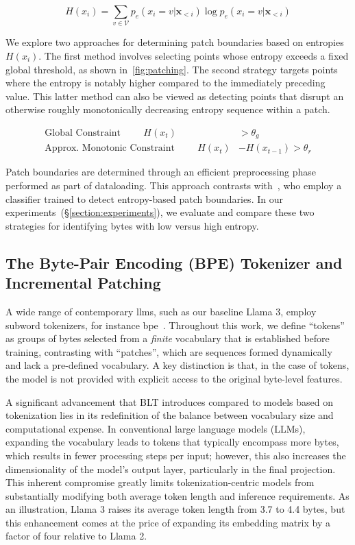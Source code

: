 \begin{equation}
H(x_i) = \sum_{v \in \mathcal{V}} p_{e}(x_i=v|\pmb{x}_{<i}) \log p_{e}(x_i=v|\pmb{x}_{<i})
\end{equation}

We explore two approaches for determining patch boundaries based on entropies $H(x_i)$. The first method involves selecting points whose entropy exceeds a fixed global threshold, as shown in~\autoref{fig:patching}. The second strategy targets points where the entropy is notably higher compared to the immediately preceding value. This latter method can also be viewed as detecting points that disrupt an otherwise roughly monotonically decreasing entropy sequence within a patch.

\begin{align*}
    \text{Global Constraint}\hspace{1cm}H(x_t)& > \theta_g\\
    \text{Approx. Monotonic Constraint}\hspace{1cm}H(x_t)& - H(x_{t-1}) > \theta_r
\end{align*}

Patch boundaries are determined through an efficient preprocessing phase performed as part of dataloading. This approach contrasts with~\citet{nawrot-etal-2023-efficient}, who employ a classifier trained to detect entropy-based patch boundaries. In our experiments~(\S\ref{section:experiments}), we evaluate and compare these two strategies for identifying bytes with low versus high entropy.

\subsection{The Byte-Pair Encoding (BPE) Tokenizer and Incremental Patching}
\label{section:incremental-patching}
\label{section:bpe-patch}

A wide range of contemporary llms, such as our baseline Llama 3, employ subword tokenizers, for instance bpe~\citep{gage1994new, sennrich-etal-2016-neural}. Throughout this work, we define ``tokens'' as groups of bytes selected from a \textit{finite} vocabulary that is established before training, contrasting with ``patches'', which are sequences formed dynamically and lack a pre-defined vocabulary. A key distinction is that, in the case of tokens, the model is not provided with explicit access to the original byte-level features.

A significant advancement that {\textsc BLT} introduces compared to models based on tokenization lies in its redefinition of the balance between vocabulary size and computational expense. In conventional large language models (LLMs), expanding the vocabulary leads to tokens that typically encompass more bytes, which results in fewer processing steps per input; however, this also increases the dimensionality of the model’s output layer, particularly in the final projection. This inherent compromise greatly limits tokenization-centric models from substantially modifying both average token length and inference requirements. As an illustration, Llama 3 raises its average token length from 3.7 to 4.4 bytes, but this enhancement comes at the price of expanding its embedding matrix by a factor of four relative to Llama 2.

